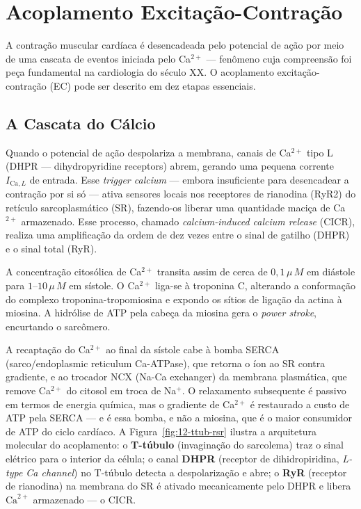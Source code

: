 \section{Acoplamento Excitação-Contração}
\label{sec:12-ec}

A contração muscular cardíaca é desencadeada pelo potencial de ação por
meio de uma cascata de eventos iniciada pelo Ca$^{2+}$ --- fenômeno cuja
compreensão foi peça fundamental na cardiologia do século XX. O
acoplamento excitação-contração (EC) pode ser descrito em dez etapas
essenciais.

\subsection{A Cascata do Cálcio}
\label{sub:image12-cascata}

Quando o potencial de ação despolariza a membrana, canais de Ca$^{2+}$
tipo L (DHPR --- dihydropyridine receptors) abrem, gerando uma pequena
corrente $I_{\mathrm{Ca},L}$ de entrada. Esse \emph{trigger calcium}
--- embora insuficiente para desencadear a contração por si só ---
ativa sensores locais nos receptores de rianodina (RyR2) do retículo
sarcoplasmático (SR), fazendo-os liberar uma quantidade maciça de
Ca$^{2+}$ armazenado. Esse processo, chamado \emph{calcium-induced
calcium release} (CICR), realiza uma amplificação da ordem de dez vezes
entre o sinal de gatilho (DHPR) e o sinal total (RyR).

A concentração citosólica de Ca$^{2+}$ transita assim de cerca de
$0{,}1\,\mu\,M$ em diástole para $1$--$10\,\mu\,M$ em sístole. O Ca$^{2+}$
liga-se à troponina C, alterando a conformação do complexo
troponina-tropomiosina e expondo os sítios de ligação da actina à
miosina. A hidrólise de ATP pela cabeça da miosina gera o \emph{power
stroke}, encurtando o sarcômero.

A recaptação do Ca$^{2+}$ ao final da sístole cabe à bomba SERCA
(sarco/endoplasmic reticulum Ca-ATPase), que retorna o íon ao SR contra
gradiente, e ao trocador NCX (Na-Ca exchanger) da membrana plasmática,
que remove Ca$^{2+}$ do citosol em troca de Na$^+$. O relaxamento
subsequente é passivo em termos de energia química, mas o gradiente de
Ca$^{2+}$ é restaurado a custo de ATP pela SERCA --- e é essa bomba, e não
a miosina, que é o maior consumidor de ATP do ciclo cardíaco. A
Figura~\ref{fig:12-ttub-rsr} ilustra a arquitetura molecular do
acoplamento: o \textbf{T-túbulo} (invaginação do sarcolema) traz o
sinal elétrico para o interior da célula; o canal \textbf{DHPR}
(receptor de dihidropiridina, \emph{L-type Ca channel}) no T-túbulo
detecta a despolarização e abre; o \textbf{RyR} (receptor de rianodina)
na membrana do SR é ativado mecanicamente pelo DHPR e libera
$\mathrm{Ca}^{2+}$ armazenado --- o CICR.

